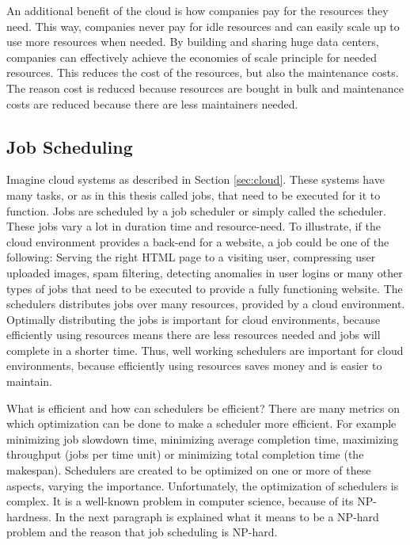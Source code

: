 An additional benefit of the cloud is how companies pay for the resources they
need. This way, companies never pay for idle resources and can easily scale up
to use more resources when needed. By building and sharing huge data centers,
companies can effectively achieve the economies of scale principle for needed
resources. This reduces the cost of the resources, but also the maintenance
costs. The reason cost is reduced because resources are bought in bulk and
maintenance costs are reduced because there are less maintainers needed.

\subsection{Job Scheduling}\label{sec:scheduling}

Imagine cloud systems as described in Section \ref{sec:cloud}. These systems
have many tasks, or as in this thesis called jobs, that need to be executed
for it to function. Jobs are scheduled by a job scheduler or simply called the
scheduler. These jobs vary a lot in duration time and resource-need. To
illustrate, if the cloud environment provides a back-end for a website, a job
could be one of the following: Serving the right HTML page to a visiting user,
compressing user uploaded images, spam filtering, detecting anomalies in user
logins or many other types of jobs that need to be executed to provide a fully
functioning website. The schedulers distributes jobs over many resources,
provided by a cloud environment. Optimally distributing the jobs is important
for cloud environments, because efficiently using resources means there are
less resources needed and jobs will complete in a shorter time. Thus, well
working schedulers are important for cloud environments, because efficiently
using resources saves money and is easier to maintain.

What is efficient and how can schedulers be efficient? There are many metrics
on which optimization can be done to make a scheduler more efficient. For
example minimizing job slowdown time, minimizing average completion time,
maximizing throughput (jobs per time unit) or minimizing total completion time
(the makespan). Schedulers are created to be optimized on one or more of these
aspects, varying the importance. Unfortunately, the optimization of schedulers
is complex. It is a well-known problem in computer science, because of its
NP-hardness. In the next paragraph is explained what it means to be a NP-hard
problem and the reason that job scheduling is NP-hard.


